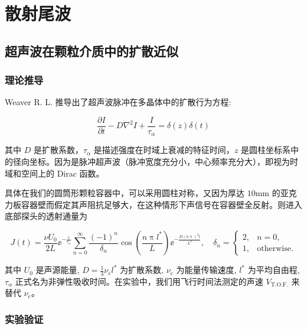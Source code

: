 
\chapter{散射尾波}

\section{超声波在颗粒介质中的扩散近似}

\subsection{理论推导}

Weaver R. L. 推导出了超声波脉冲在多晶体中的扩散行为方程\cite{diffusivity}:

\begin{equation}
  \frac{\partial I}{\partial t} - D\nabla^{2}I + \frac{I}{\tau_{\alpha}} = \delta(z)\delta(t)
\end{equation}

其中 $D$ 是扩散系数，$\tau_{\alpha}$ 是描述强度在时域上衰减的特征时间，$z$ 是圆柱坐标系中的径向坐标。因为是脉冲超声波（脉冲宽度充分小，中心频率充分大），即视为时域和空间上的 Dirac 函数。

具体在我们的圆筒形颗粒容器中，可以采用圆柱对称，又因为厚达 $10\unit{\milli\meter}$ 的亚克力板容器壁而假定其声阻抗足够大，在这种情形下声信号在容器壁全反射。则进入底部探头的透射通量\cite{PhysRevLett.93.154303}为

\begin{equation}
  J(t) = \frac{\nu U_{0}}{2L}{\ee}^{-\frac{t}{\tau_{\alpha}}}\sum_{n=0}^{\infty}\frac{(-1)^{n}}{\delta_{n}}\cos{\left(\frac{n\uppi l^{*}}{L}\right)}{\ee}^{-\frac{D(n\uppi)^{2}t}{L^{2}}},\quad \delta_{n} = \begin{cases}
    2, & n = 0, \\
    1, & \text{otherwise}.
  \end{cases}
\end{equation}

其中 $U_{0}$ 是声源能量, $D = \frac{1}{3}\nu_{e}l^{*}$ 为扩散系数, $\nu_{e}$ 为能量传输速度, $l^{*}$ 为平均自由程, $\tau_{\alpha}$ 正式名为非弹性吸收时间。在实验中，我们用飞行时间法测定的声速 $V_{\text{T.O.F.}}$ 来替代 $\nu_{e}$。


\subsection{实验验证}



